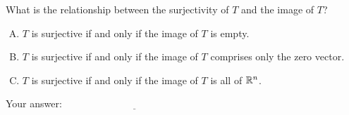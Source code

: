 \documentclass[10pt]{amsart}
\begin{document}
\begin{enumerate}
  What is the relationship between the surjectivity of $T$ and the
  image of $T$?

  \begin{enumerate}[(A)]
  \item $T$ is surjective if and only if the image of $T$ is empty.
  \item $T$ is surjective if and only if the image of $T$ comprises
    only the zero vector.
  \item $T$ is surjective if and only if the image of $T$ is all of
    $\mathbb{R}^n$.
  \end{enumerate}

  \vspace{0.1in}
  Your answer: $\underline{\qquad\qquad\qquad\qquad\qquad\qquad\qquad}$
  \vspace{0.1in}

\end{enumerate}
\end{document}
